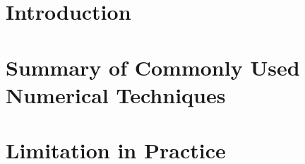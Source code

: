 \section{Introduction}


\section{Summary of Commonly Used Numerical Techniques}


\section{Limitation in Practice}
